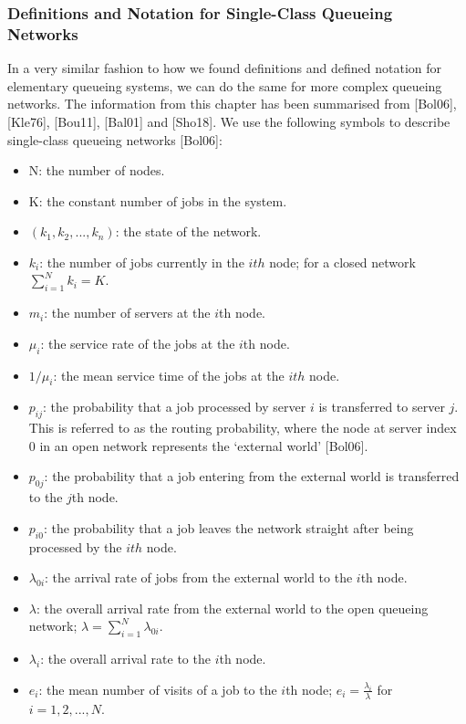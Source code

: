 \documentclass[a4paper,11pt,titlepage]{article}
\begin{document}
\subsubsection{Definitions and Notation for Single-Class Queueing Networks}

In a very similar fashion to how we found definitions and defined notation for elementary queueing systems, we can do the same for more complex queueing networks. The information from this chapter has been summarised from [Bol06], [Kle76], [Bou11], [Bal01] and [Sho18]. We use the following symbols to describe single-class queueing networks [Bol06]:

\begin{itemize}
    \item N: the number of nodes.
    \item K: the constant number of jobs in the system.
    \item $(k_1,k_2,...,k_n)$: the state of the network.
    \item $k_i$: the number of jobs currently in the $ith$ node; for a closed network $\sum_{i=1}^{N} k_i = K$.
    \item $m_i$: the number of servers at the $i$th node.
    \item $\mu_i$: the service rate of the jobs at the $i$th node.
    \item $1/\mu_i$: the mean service time of the jobs at the $ith$ node.
    \item $p_{ij}$: the probability that a job processed by server $i$ is transferred to server $j$. This is referred to as the routing probability, where the node at server index $0$ in an open network represents the `external world' [Bol06].
    \item $p_{0j}$: the probability that a job entering from the external world is transferred to the $j$th node.
    \item $p_{i0}$: the probability that a job leaves the network straight after being processed by the $ith$ node.
    \item $\lambda_{0i}$: the arrival rate of jobs from the external world to the $i$th node.
    \item $\lambda$: the overall arrival rate from the external world to the open queueing network; $\lambda = \sum_{i=1}^{N} \lambda_{0i}$.
    \item $\lambda_i$: the overall arrival rate to the $i$th node.
    \item $e_i$: the mean number of visits of a job to the $i$th node; $e_i = \frac{\lambda_i}{\lambda}$ for $i = 1,2,...,N$.
\end{itemize}
\end{document}
